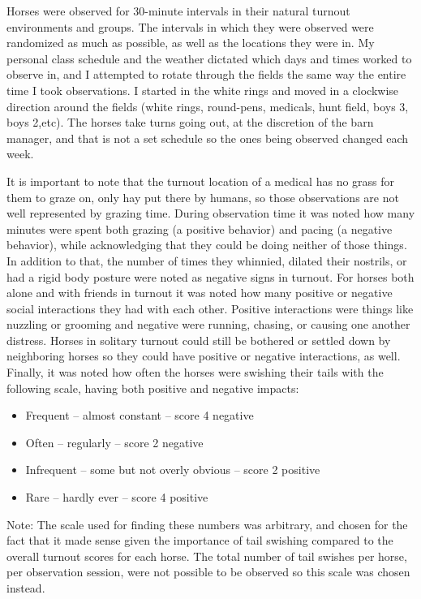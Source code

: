 \documentclass[
]{article}
\providecommand{\tightlist}{%
  \setlength{\itemsep}{0pt}\setlength{\parskip}{0pt}}
\begin{document}
Horses were observed for 30-minute intervals in their natural turnout
environments and groups. The intervals in which they were observed were
randomized as much as possible, as well as the locations they were in.
My personal class schedule and the weather dictated which days and times
worked to observe in, and I attempted to rotate through the fields the
same way the entire time I took observations. I started in the white
rings and moved in a clockwise direction around the fields (white rings,
round-pens, medicals, hunt field, boys 3, boys 2,etc). The horses take
turns going out, at the discretion of the barn manager, and that is not
a set schedule so the ones being observed changed each week.

It is important to note that the turnout location of a medical has no
grass for them to graze on, only hay put there by humans, so those
observations are not well represented by grazing time. During
observation time it was noted how many minutes were spent both grazing
(a positive behavior) and pacing (a negative behavior), while
acknowledging that they could be doing neither of those things. In
addition to that, the number of times they whinnied, dilated their
nostrils, or had a rigid body posture were noted as negative signs in
turnout. For horses both alone and with friends in turnout it was noted
how many positive or negative social interactions they had with each
other. Positive interactions were things like nuzzling or grooming and
negative were running, chasing, or causing one another distress. Horses
in solitary turnout could still be bothered or settled down by
neighboring horses so they could have positive or negative interactions,
as well. Finally, it was noted how often the horses were swishing their
tails with the following scale, having both positive and negative
impacts:

\begin{itemize}
\tightlist
\item
  Frequent -- almost constant -- score 4 negative
\item
  Often -- regularly -- score 2 negative
\item
  Infrequent -- some but not overly obvious -- score 2 positive
\item
  Rare -- hardly ever -- score 4 positive
\end{itemize}

Note: The scale used for finding these numbers was arbitrary, and chosen
for the fact that it made sense given the importance of tail swishing
compared to the overall turnout scores for each horse. The total number
of tail swishes per horse, per observation session, were not possible to
be observed so this scale was chosen instead.
\end{document}
